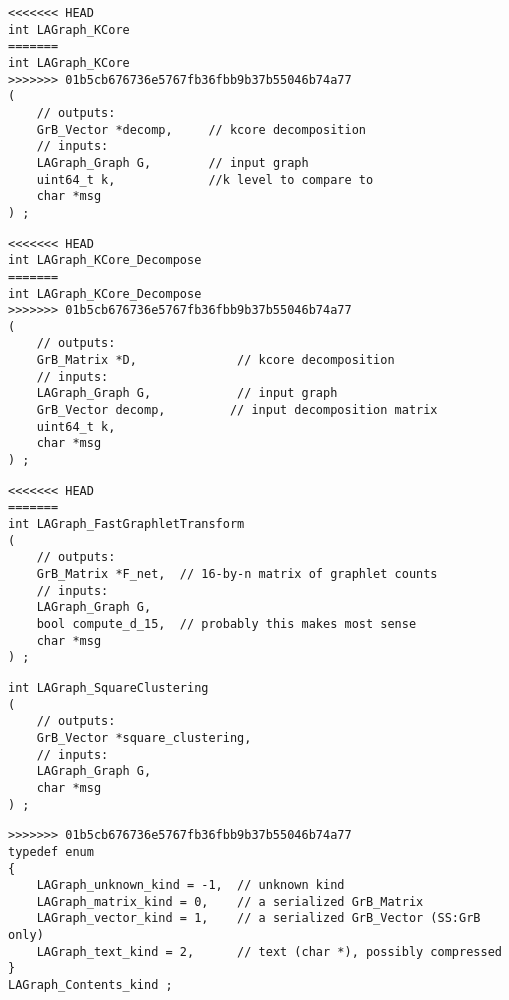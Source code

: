 \begin{verbatim}
<<<<<<< HEAD
int LAGraph_KCore       
=======
int LAGraph_KCore
>>>>>>> 01b5cb676736e5767fb36fbb9b37b55046b74a77
(
    // outputs:
    GrB_Vector *decomp,     // kcore decomposition
    // inputs:
    LAGraph_Graph G,        // input graph
    uint64_t k,             //k level to compare to
    char *msg
) ;
\end{verbatim}




\begin{verbatim}
<<<<<<< HEAD
int LAGraph_KCore_Decompose      
=======
int LAGraph_KCore_Decompose
>>>>>>> 01b5cb676736e5767fb36fbb9b37b55046b74a77
(
    // outputs:
    GrB_Matrix *D,              // kcore decomposition
    // inputs:
    LAGraph_Graph G,            // input graph
    GrB_Vector decomp,         // input decomposition matrix
    uint64_t k,
    char *msg
) ;
\end{verbatim}




\begin{verbatim}
<<<<<<< HEAD
=======
int LAGraph_FastGraphletTransform
(
    // outputs:
    GrB_Matrix *F_net,  // 16-by-n matrix of graphlet counts
    // inputs:
    LAGraph_Graph G,
    bool compute_d_15,  // probably this makes most sense
    char *msg
) ;
\end{verbatim}




\begin{verbatim}
int LAGraph_SquareClustering
(
    // outputs:
    GrB_Vector *square_clustering,
    // inputs:
    LAGraph_Graph G,
    char *msg
) ;
\end{verbatim}




\begin{verbatim}
>>>>>>> 01b5cb676736e5767fb36fbb9b37b55046b74a77
typedef enum
{
    LAGraph_unknown_kind = -1,  // unknown kind
    LAGraph_matrix_kind = 0,    // a serialized GrB_Matrix
    LAGraph_vector_kind = 1,    // a serialized GrB_Vector (SS:GrB only)
    LAGraph_text_kind = 2,      // text (char *), possibly compressed
}
LAGraph_Contents_kind ;
\end{verbatim}




